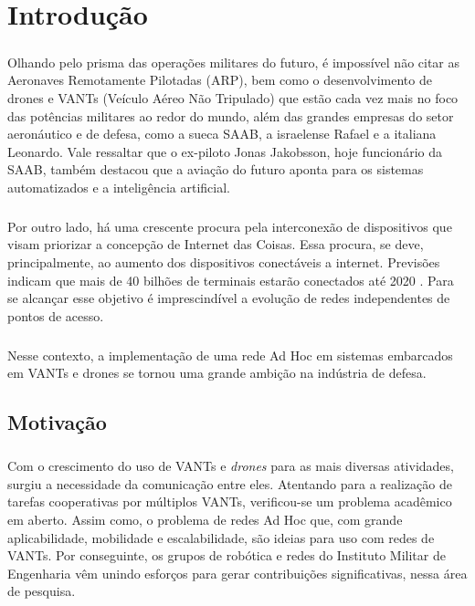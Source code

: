 \chapter{Introdução}
\noindent

\paragraph{} Olhando pelo prisma das operações militares do futuro, é impossível não citar as Aeronaves Remotamente Pilotadas (ARP), bem como o desenvolvimento de drones e VANTs (Veículo Aéreo Não Tripulado) que estão cada vez mais no foco das potências militares ao redor do mundo, além das grandes empresas do setor aeronáutico e de defesa, como a sueca SAAB, a israelense Rafael e a italiana Leonardo. Vale ressaltar que o ex-piloto Jonas Jakobsson, hoje funcionário da SAAB, também destacou \citep{FAB2016} que a aviação do futuro aponta para os sistemas automatizados e a inteligência artificial.

\paragraph{} Por outro lado, há uma crescente procura pela interconexão de dispositivos que visam priorizar a concepção de Internet das Coisas. Essa procura, se deve, principalmente, ao aumento dos dispositivos conectáveis a internet. Previsões indicam que mais de 40 bilhões de terminais estarão conectados até 2020 \citep{Forbes2014}. Para se alcançar esse objetivo é imprescindível a evolução de redes independentes de pontos de acesso.

\paragraph{} Nesse contexto, a implementação de uma rede Ad Hoc em sistemas embarcados em VANTs e drones se tornou uma grande ambição na indústria de defesa. 

\section{Motivação}
\paragraph{} Com o crescimento do uso de VANTs e \textit{drones} para as mais diversas atividades, surgiu a necessidade da comunicação entre eles. Atentando para a realização de tarefas cooperativas por múltiplos VANTs, verificou-se um problema acadêmico em aberto. Assim como, o problema de redes Ad Hoc que, com grande aplicabilidade, mobilidade e escalabilidade, são ideias para uso com redes de VANTs. Por conseguinte, os grupos de robótica e redes do Instituto Militar de Engenharia vêm unindo esforços para gerar contribuições significativas, nessa área de pesquisa.

